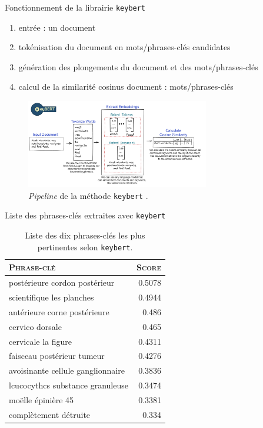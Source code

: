 \begin{frame}{Fonctionnement de la librairie \texttt{keybert}}
\begin{enumerate}[<+->]
\item entrée : un document
\item tokénisation du document en mots/phrases-clés candidates
\item génération des plongements du document et des mots/phrases-clés
\item calcul de la similarité cosinus document : mots/phrases-clés
\end{enumerate}
\begin{figure}
    \centering
    \includegraphics[width=80mm,scale=0.5]{pic/keybert.png}
    \caption{\textit{Pipeline} de la méthode \texttt{keybert} \citep{grootendorst2020keybert}.}
    \label{fig:enter-label}
\end{figure}
\end{frame}

\begin{frame}{Liste des phrases-clés extraites avec \texttt{keybert}}
\begin{table}
\small
\begin{tabular}{l|r}
\rowcolor[HTML]{FFCCC9} 
\textsc{\textbf{Phrase-clé}} & \cellcolor[HTML]{DAE8FC}\textsc{\textbf{Score}} \\ \hline
postérieure cordon postérieur & 0.5078 \\
scientifique les planches &  0.4944 \\
antérieure corne postérieure & 0.486 \\
cervico dorsale & 0.465 \\
cervicale la figure & 0.4311 \\
faisceau postérieur tumeur & 0.4276 \\
avoisinante cellule ganglionnaire & 0.3836 \\
lcucocythcs substance granuleuse & 0.3474 \\
moëlle épinière 45 & 0.3381 \\
complètement détruite & 0.334 \\
\end{tabular}
\caption{Liste des dix phrases-clés les plus pertinentes selon \texttt{keybert}.}
\end{table}
\end{frame}

